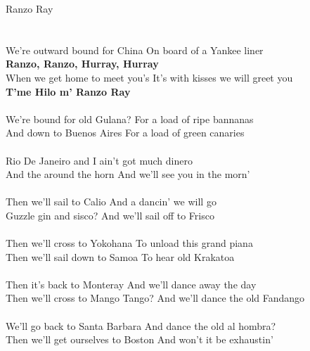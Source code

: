 \documentclass[letterpaper,9pt]{article}
\begin{document}
\newpage
{}
\huge
Ranzo Ray\\
\\
\LARGE
\\We’re outward bound for China On board of a Yankee liner
\\\textbf{Ranzo, Ranzo, Hurray, Hurray}
\\When we get home to meet you’s It’s with kisses we will greet you
\\\textbf{T’me Hilo m’ Ranzo Ray}
\\
\\We’re bound for old Gulana? For a load of ripe bannanas
\\And down to Buenos Aires For a load of green canaries
\\
\\Rio De Janeiro and I ain’t got much dinero
\\And the around the horn And we’ll see you in the morn’
\\
\\Then we’ll sail to Calio And a dancin’ we will go
\\Guzzle gin and sisco? And we’ll sail off to Frisco
\\
\\Then we’ll cross to Yokohana To unload this grand piana
\\Then we’ll sail down to Samoa To hear old Krakatoa
\\
\\Then it’s back to Monteray And we’ll dance away the day
\\Then we’ll cross to Mango Tango? And we’ll dance the old Fandango
\\
\\We’ll go back to Santa Barbara And dance the old al hombra?
\\Then we’ll get ourselves to Boston And won’t it be exhaustin’
\end{document}
